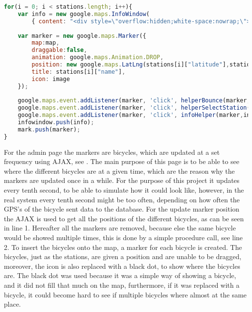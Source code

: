\begin{minipage}{\textwidth}
\begin{lstlisting}[caption={Construction of stations}, label={lst:creationofstations}, language=Javascript]
for(i = 0; i < stations.length; i++){
	var info = new google.maps.InfoWindow(
		{ content: "<div style=\"overflow:hidden;white-space:nowrap;\"><b>" + stations[i]["name"] + "</b><br/> Available Bicycles: " + freeBicycleList[i+1] + "<br/> Available Docks: " + freeDockList[i+1] + "</div>"});
            
	var marker = new google.maps.Marker({
		map:map,
		draggable:false,
		animation: google.maps.Animation.DROP,
		position: new google.maps.LatLng(stations[i]["latitude"],stations[i]["longitude"]),
		title: stations[i]["name"],
		icon: image
	});
            
	google.maps.event.addListener(marker, 'click', helperBounce(marker,toggleBounce));
	google.maps.event.addListener(marker, 'click', helperSelectStation(SelectStationFromList, marker.title));
	google.maps.event.addListener(marker, 'click', infoHelper(marker,info,map));
	infowindow.push(info);
	mark.push(marker);
}
\end{lstlisting}
\end{minipage}

For the admin page the markers are bicycles, which are updated at a set frequency using AJAX, see .
The main purpose of this page is to be able to see where the different bicycles are at a given time, which are the reason why the markers are updated once in a while.
For the purpose of this project it updates every tenth second, to be able to simulate how it could look like, however, in the real system every tenth second might be too often, depending on how often the GPS's of the bicycle sent data to the database.
For the update marker position the AJAX is used to get all the positions of the different bicycles, as can be seen in line 1.
Hereafter all the markers are removed, because else the same bicycle would be showed multiple times, this is done by a simple procedure call, see line 2.
To insert the bicycles onto the map, a marker for each bicycle is created.
The bicycles, just as the stations, are given a position and are unable to be dragged, moreover, the icon is also replaced with a black dot, to show where the bicycles are.
The black dot was used because it was a simple way of showing a bicycle, and it did not fill that much on the map, furthermore, if it was replaced with a bicycle, it could become hard to see if multiple bicycles where almost at the same place.

